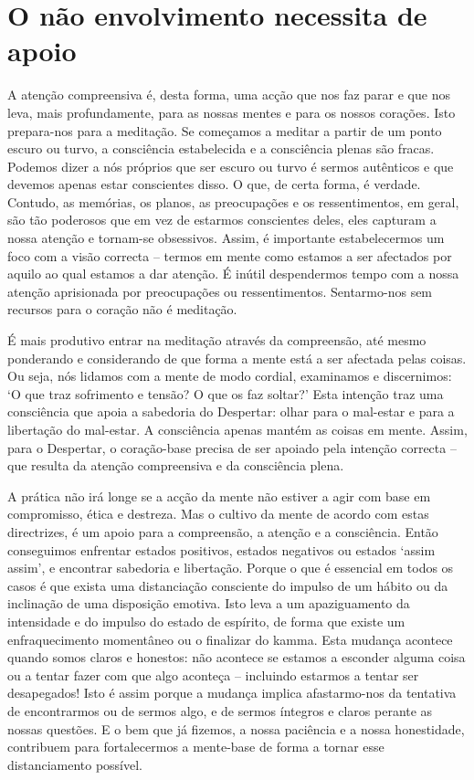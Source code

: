 \section{O não envolvimento necessita de apoio}

A atenção compreensiva é, desta forma, uma acção que nos faz parar e que nos
leva, mais profundamente, para as nossas mentes e para os nossos corações. Isto
prepara-nos para a meditação. Se começamos a meditar a partir de um ponto escuro
ou turvo, a consciência estabelecida e a consciência plenas são fracas. Podemos
dizer a nós próprios que ser escuro ou turvo é sermos autênticos e que devemos
apenas estar conscientes disso. O que, de certa forma, é verdade. Contudo, as
memórias, os planos, as preocupações e os ressentimentos, em geral, são tão
poderosos que em vez de estarmos conscientes deles, eles capturam a nossa
atenção e tornam-se obsessivos. Assim, é importante estabelecermos um foco com a
visão correcta -- termos em mente como estamos a ser afectados por aquilo ao
qual estamos a dar atenção. É inútil despendermos tempo com a nossa atenção
aprisionada por preocupações ou ressentimentos. Sentarmo-nos sem recursos para o
coração não é meditação.

É mais produtivo entrar na meditação através da compreensão, até mesmo
ponderando e considerando de que forma a mente está a ser afectada pelas coisas.
Ou seja, nós lidamos com a mente de modo cordial, examinamos e discernimos: `O
que traz sofrimento e tensão? O que os faz soltar?' Esta intenção traz uma
consciência que apoia a sabedoria do Despertar: olhar para o mal-estar e para a
libertação do mal-estar. A consciência apenas mantém as coisas em mente. Assim,
para o Despertar, o coração-base precisa de ser apoiado pela intenção correcta
-- que resulta da atenção compreensiva e da consciência plena.

\enlargethispage{\baselineskip}

A prática não irá longe se a acção da mente não estiver a agir com base em
compromisso, ética e destreza. Mas o cultivo da mente de acordo com estas
directrizes, é um apoio para a compreensão, a atenção e a consciência. Então
conseguimos enfrentar estados positivos, estados negativos ou estados `assim
assim', e encontrar sabedoria e libertação. Porque o que é essencial em todos os
casos é que exista uma distanciação consciente do impulso de um hábito ou da
inclinação de uma disposição emotiva. Isto leva a um apaziguamento da
intensidade e do impulso do estado de espírito, de forma que existe um
enfraquecimento momentâneo ou o finalizar do kamma. Esta mudança acontece quando
somos claros e honestos: não acontece se estamos a esconder alguma coisa ou a
tentar fazer com que algo aconteça -- incluindo estarmos a tentar ser
desapegados! Isto é assim porque a mudança implica afastarmo-nos da tentativa de
encontrarmos ou de sermos algo, e de sermos íntegros e claros perante as nossas
questões. E o bem que já fizemos, a nossa paciência e a nossa honestidade,
contribuem para fortalecermos a mente-base de forma a tornar esse distanciamento
possível.


